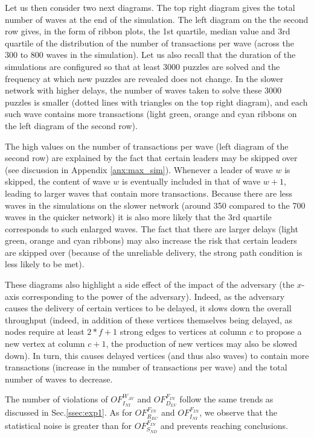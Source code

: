 Let us then consider two next diagrams. 
The top right diagram gives the total number of waves at the end of the simulation.
The left diagram on the the second row gives, in the form of ribbon plots, the 1st quartile, median value and 3rd quartile of the distribution of the number of transactions per wave (across the 300 to 800 waves in the simulation).
Let us also recall that the duration of the simulations are configured so that at least 3000 puzzles are solved and the frequency at which new puzzles are revealed does not change.
In the slower network with higher delays, the number of waves taken to solve these 3000 puzzles is smaller (dotted lines with triangles on the top right diagram), and each such wave contains more transactions (light green, orange and cyan ribbons on the left diagram of the second row).

The high values on the number of transactions per wave (left diagram of the second row) are explained by the fact that certain leaders may be skipped over (see discussion in Appendix \ref{anx:max_sim}). Whenever a leader of wave $w$ is skipped, the content of wave $w$ is eventually included in that of wave $w+1$, leading to larger waves that contain more transactions.
Because there are less waves in the simulations on the slower network (around 350 compared to the 700 waves in the quicker network) it is also more likely that the 3rd quartile corresponds to such enlarged waves.
The fact that there are larger delays (light green, orange and cyan ribbons) may also increase the risk that certain leaders are skipped over (because of the unreliable delivery, the strong path condition is less likely to be met).

These diagrams also highlight a side effect of the impact of the adversary (the $x$-axis corresponding to the power of the adversary).
Indeed, as the adversary causes the delivery of certain vertices to be delayed, it slows down the overall throughput (indeed, in addition of these vertices themselves being delayed, as nodes require at least $2*f+1$ strong edges to vertices at column $c$ to propose a new vertex at column $c+1$, the production of new vertices may also be slowed down).
In turn, this causes delayed vertices (and thus also waves) to contain more transactions (increase in the number of transactions per wave) and the total number of waves to decrease.

The number of violations of $OF_{I_{NI}}^{W_{AV}}$ and $OF_{D_{LV}}^{F_{IN}}$ follow the same trends as discussed in Sec.\ref{ssec:exp1}.
As for $OF_{R_{EC}}^{F_{IN}}$ and $OF_{I_{NI}}^{F_{IN}}$, we observe that the statistical noise is greater than for $OF_{S_{ND}}^{F_{IN}}$ and prevents reaching conclusions.


